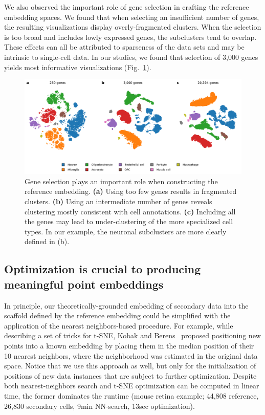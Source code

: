 \documentclass[runningheads]{llncs}
\begin{document}
We also observed the important role of gene selection in crafting the
reference embedding spaces. We found that when selecting an insufficient
number of genes, the resulting visualizations display overly-fragmented
clusters. When the selection is too broad and includes lowly expressed genes,
the subclusters tend to overlap. These effects can all be attributed to
sparseness of the data sets and may be intrinsic to single-cell data. In our
studies, we found that selection of 3,000 genes yields most informative
visualizations (Fig.~\ref{fig:gene_selection}).

\begin{figure}[htbp]
  \includegraphics[width=\textwidth]{hrvatin_embedding_tsne_genes.pdf}
  \caption{Gene selection plays an important role when constructing the
  reference embedding. {\bf (a)} Using too few genes results in fragmented
  clusters. {\bf (b)} Using an intermediate number of genes reveals clustering
  mostly consistent with cell annotations. {\bf (c)} Including all the genes
  may lead to under-clustering of the more specialized cell types. In our example, the neuronal subclusters are more clearly defined in (b).}
  \label{fig:gene_selection}
\end{figure}

\subsection{Optimization is crucial to producing meaningful point embeddings}

In principle, our theoretically-grounded embedding of secondary data into the
scaffold defined by the reference embedding could be simplified with the
application of the nearest neighbors-based procedure. For example, while
describing a set of tricks for t-SNE, Kobak and Berens~\cite{Kobak2019}
proposed positioning new points into a known embedding by placing them in the
median position of their 10 nearest neighbors, where the neighborhood was
estimated in the original data space. Notice that we use this approach as well,
but only for the initialization of positions of new data instances that are
subject to further optimization. Despite both nearest-neighbors search and
t-SNE optimization can be computed in linear time, the former dominates the
runtime (mouse retina example; 44,808 reference, 26,830 secondary cells,
9min NN-search, 13sec optimization).
\end{document}
